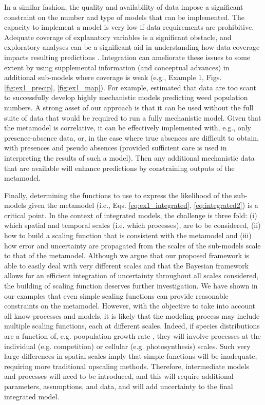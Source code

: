 \documentclass[11pt]{article}
\begin{document}
In a similar fashion, the quality and availability of data impose a significant constraint on the number and type of models that can be implemented.
The capacity to implement a model is very low if data requirements are prohibitive. 
Adequate coverage of explanatory variables is a significant obstacle, and exploratory analyses can be a significant aid in understanding how data coverage impacts resulting predictions \citep{Mckenney2002}.
Integration can ameliorate these issues to some extent by using supplemental information (and conceptual advances) in additional sub-models where coverage is weak (e.g., Example 1, Figs. \ref{fig:ex1_precip}, \ref{fig:ex1_map}).
For example, \citet{Freckleton2009} estimated that data are too scant to successfully develop highly mechanistic models predicting weed population numbers. 
A strong asset of our approach is that it can be used without the full suite of data that would be required to run a fully mechanistic model. 
Given that the metamodel is correlative, it can be effectively implemented with, e.g., only presence-absence data, or, in the case where true absences are difficult to obtain, with presences and pseudo absences (provided sufficient care is used in interpreting the results of such a model).
Then any additional mechanistic data that are available will enhance predictions by constraining outputs of the metamodel. 

Finally, determining the functions to use to express the likelihood of the sub-models given the metamodel (i.e., Eqs. \ref{eq:ex1_integrated}, \ref{eq:integrated2}) is a critical point.
In the context of integrated models, the challenge is three fold: (i) which spatial and temporal scales (i.e. which processes), are to be considered, (ii) how to build a scaling function that is consistent with the metamodel and (iii) how error and uncertainty are propagated from the scales of the sub-models scale to that of the metamodel. 
Although we argue that our proposed framework is able to easily deal with very different scales and that the Bayesian framework allows for an efficient integration of uncertainty throughout all scales considered, the building of scaling function deserves further investigation. 
We have shown in our examples that even simple scaling functions can provide reasonable constraints on the metamodel. 
However, with the objective to take into account all know processes and models, it is likely that the modeling process may include multiple scaling functions, each at different scales. 
Indeed, if species distributions are a function of, e.g. poopulation growth rate \citep{Sykes1996, Guisan2000}, they will involve processes at the individual (e.g. competition) or cellular (e.g. photosynthesis) scales. 
Such very large differences in spatial scales imply that simple functions will be inadequate, requiring more traditional upscaling methods. 
Therefore, intermediate models and processes will need to be introduced, and this will require additional parameters, assumptions, and data, and will add uncertainty to the final integrated model.
\end{document}
